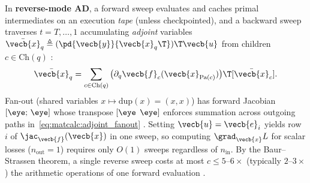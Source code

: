 \documentclass[../../../../master.tex]{subfiles}
\begin{document}
In \textbf{reverse-mode AD}, a forward sweep evaluates and caches primal intermediates on an execution \emph{tape} (unless checkpointed), and a backward sweep traverses $t = T, \dots, 1$ accumulating \emph{adjoint} variables $\bar{\vecb{x}}_q \triangleq (\pd{\vecb{y}}{\vecb{x}_q\T})\T \vecb{u}$ from children $c \in \mathrm{Ch}(q)$ :
\begin{equation}
  \bar{\vecb{x}}_q = \sum_{c \in \mathrm{Ch}(q)} \big(\partial_q \vecb{f}_c(\vecb{x}_{\mathrm{Pa}(c)})\big)\T [\bar{\vecb{x}}_c].
  \label{eq:matcalc:adjoint_fanout}
\end{equation}
Fan-out (shared variables $x \mapsto \mathrm{dup}(x) = (x, x)$) has forward Jacobian $[\eye;\,\eye]$ whose transpose $[\eye\;\,\eye]$ enforces summation across outgoing paths in~\eqref{eq:matcalc:adjoint_fanout} . Setting $\vecb{u} = \vecb{e}_i$ yields row $i$ of $\jac_{\vecb{f}}(\vecb{x})$ in one sweep, so computing $\grad_{\vecb{x}} L$ for scalar losses ($n_{\text{out}} = 1$) requires only $O(1)$ sweeps regardless of $n_{\text{in}}$. By the Baur--Strassen theorem, a single reverse sweep costs at most $c \le 5\text{--}6\times$ (typically $2\text{--}3\times$) the arithmetic operations of one forward evaluation .
\end{document}
